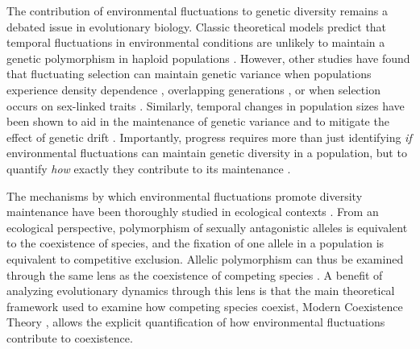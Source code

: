 \begin{refsection}
The contribution of environmental fluctuations to genetic diversity remains a debated issue in evolutionary biology. Classic theoretical models predict that temporal fluctuations in environmental conditions are unlikely to maintain a genetic polymorphism in haploid populations \citep{dempster1955maintenance,hedrick1974genetic,hedrick1986genetic}. However, other studies have found that fluctuating selection can maintain genetic variance when populations experience density dependence \citep{dean2005protecting}, overlapping generations \citep{ellner1994role, ellner1996patterns}, or when selection occurs on sex-linked traits \citep{reinhold2000maintenance}. Similarly, temporal changes in population sizes have been shown to aid in the maintenance of genetic variance \citep{whitlock1992temporal} and to mitigate the effect of genetic drift \citep{pemberton1996maintenance,nunney2002effective}. Importantly, progress requires more than just identifying \textit{if} environmental fluctuations can maintain genetic diversity in a population, but to quantify \textit{how} exactly they contribute to its maintenance \citep{ellner2016quantify}.

The mechanisms by which environmental fluctuations promote diversity maintenance have been thoroughly studied in ecological contexts \citep{levins1979coexistence,armstrong1980competitive,chesson2000mechanisms,barabas_chessons_2018}. From an ecological perspective, polymorphism of sexually antagonistic alleles is equivalent to the coexistence of species, and the fixation of one allele in a population is equivalent to competitive exclusion. Allelic polymorphism can thus be examined through the same lens as the coexistence of competing species \citep{ellner1994role,ellner1996patterns,dean2005protecting,schreiber2010interactive}. A benefit of analyzing evolutionary dynamics through this lens is that the main theoretical framework used to examine how competing species coexist, Modern Coexistence Theory \citep{chesson2000mechanisms, barabas_chessons_2018}, allows the explicit quantification of how environmental fluctuations contribute to coexistence.


\end{refsection}

